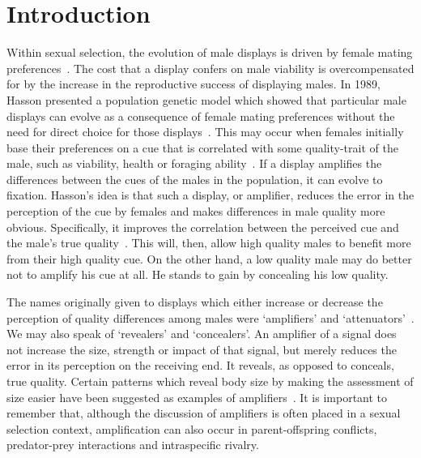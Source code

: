 \documentclass[a4paper,12pt]{article}
\numberwithin{equation}{section}
\numberwithin{figure}{section}
\begin{document}
\tableofcontents

\newpage

\section{Introduction}
\label{sec:Introduction}

Within sexual selection, the evolution of male displays is driven by female mating preferences~\cite{MaynardSmith2003,Krebs2009}. The cost that a display confers on male viability is overcompensated for by the increase in the reproductive success of displaying males. In 1989, Hasson presented a population genetic model which showed that particular male displays can evolve as a consequence of female mating preferences without the need for direct choice for those displays~\cite{Hasson1989}. This may occur when females initially base their preferences on a cue that is correlated with some quality-trait of the male, such as viability, health or foraging ability~\cite{Jennions1997}. If a display amplifies the differences between the cues of the males in the population, it can evolve to fixation. Hasson's idea is that such a display, or amplifier, reduces the error in the perception of the cue by females and makes differences in male quality more obvious. Specifically, it improves the correlation between the perceived cue and the male's true quality~\cite{Castellano2010}. This will, then, allow high quality males to benefit more from their high quality cue. On the other hand, a low quality male may do better not to amplify his cue at all. He stands to gain by concealing his low quality.

The names originally given to displays which either increase or decrease the perception of quality differences among males were `amplifiers' and `attenuators'~\cite{Hasson1992}. We may also speak of `revealers' and `concealers'. An amplifier of a signal does not increase the size, strength or impact of that signal, but merely reduces the error in its perception on the receiving end. It reveals, as opposed to conceals, true quality. Certain patterns which reveal body size by making the assessment of size easier have been suggested as examples of amplifiers~\cite{Hasson1991,Berglund2000,Berglund2001,Taylor2000}. It is important to remember that, although the discussion of amplifiers is often placed in a sexual selection context, amplification can also occur in parent-offspring conflicts, predator-prey interactions and intraspecific rivalry.
\end{document}
